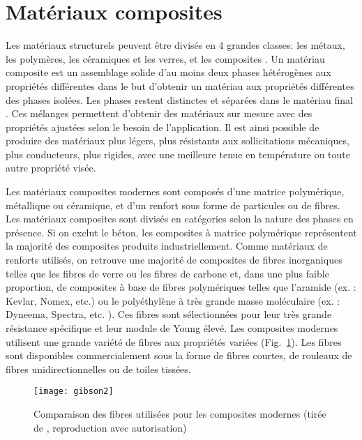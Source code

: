 \label{sec:RevLitt}

\section{Matériaux composites}

Les matériaux structurels peuvent être divisés en 4 grandes classes: les métaux, les polymères, les céramiques et les verres, et les composites \cite{ashby2018materials}. 
Un matériau composite est un assemblage solide d'au moins deux phases hétérogènes aux propriétés différentes dans le but d'obtenir un matériau aux propriétés différentes des phases isolées. 
Les phases restent distinctes et séparées dans le matériau final \cite{Wikipedia_mat_comp}. 
Ces mélanges permettent d'obtenir des matériaux sur mesure avec des propriétés ajustées selon le besoin de l'application. 
Il est ainsi possible de produire des matériaux plus légers, plus résistants aux sollicitations mécaniques, plus conducteurs, plus rigides, avec une meilleure tenue en température ou toute autre propriété visée. 

Les matériaux composites modernes sont composés d'une matrice polymérique, métallique ou céramique, et d'un renfort sous forme de particules ou de fibres. 
Les matériaux composites sont divisés en catégories selon la nature des phases en présence. 
Si on exclut le béton, les composites à matrice polymérique représentent la majorité des composites produits industriellement. 
Comme matériaux de renforts utilisés, on retrouve une majorité de composites de fibres inorganiques telles que les fibres de verre ou les fibres de carbone et, dans une plus faible proportion, de composites à base de fibres polymériques telles que l'aramide (ex. : Kevlar, Nomex, etc.) ou le polyéthylène à très grande masse moléculaire (ex. : Dyneema, Spectra, etc. ). 
Ces fibres sont sélectionnées pour leur très grande résistance spécifique et leur module de Young élevé. 
Les composites modernes utilisent une grande variété de fibres aux propriétés variées (Fig.~\ref{gibson2}). 
Les fibres sont disponibles commercialement sous la forme de fibres courtes, de rouleaux de fibres unidirectionnelles ou de toiles tissées. 

\begin{figure}
	\centering
	\texttt{[image: gibson2]}
	\caption{Comparaison des fibres utilisées pour les composites modernes (tirée de \cite{Gibson2011}, reproduction avec autorisation)}
	\label{gibson2}
\end{figure}

